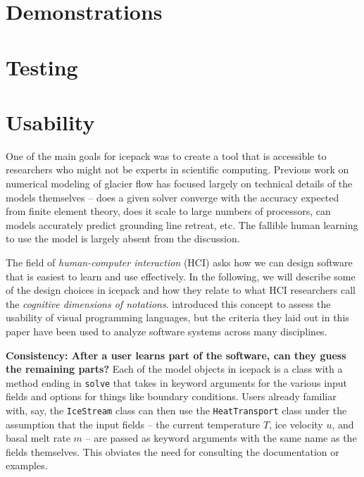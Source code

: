 \documentclass{article}
\theoremstyle{definition}
\theoremstyle{plain}
\begin{document}
\section{Demonstrations}


\section{Testing}


\section{Usability}

One of the main goals for icepack was to create a tool that is accessible to researchers who might not be experts in scientific computing.
Previous work on numerical modeling of glacier flow has focused largely on technical details of the models themselves -- does a given solver converge with the accuracy expected from finite element theory, does it scale to large numbers of processors, can models accurately predict grounding line retreat, etc.
The fallible human learning to use the model is largely absent from the discussion.

The field of \emph{human-computer interaction} (HCI) asks how we can design software that is easiest to learn and use effectively.
In the following, we will describe some of the design choices in icepack and how they relate to what HCI researchers call the \emph{cognitive dimensions of notations}.
\citet{green1996usability} introduced this concept to assess the usability of visual programming languages, but the criteria they laid out in this paper have been used to analyze software systems across many disciplines.

\textbf{Consistency: After a user learns part of the software, can they guess the remaining parts?}
Each of the model objects in icepack is a class with a method ending in \texttt{solve} that takes in keyword arguments for the various input fields and options for things like boundary conditions.
Users already familiar with, say, the \texttt{IceStream} class can then use the \texttt{HeatTransport} class under the assumption that the input fields -- the current temperature $T$, ice velocity $u$, and basal melt rate $m$ -- are passed as keyword arguments with the same name as the fields themselves.
This obviates the need for consulting the documentation or examples.
\end{document}
